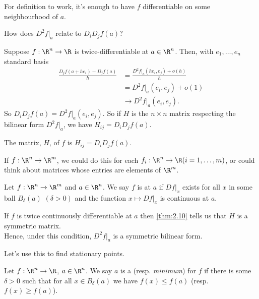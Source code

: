 \begin{remark}
For definition to work, it's enough to have $f$ differentiable on some neighbourhood of $a$.
\end{remark}

\begin{question}
    How does $D^2f|_a$ relate to $D_i D_j f(a)$?
\end{question} 

Suppose $f:\R^n\to\R$ is twice-differentiable at $a\in \R^n$. 
Then, with $e_1,\dots ,e_n$ standard basis 
\begin{align*}
    \frac{D_jf(a+he_i)-D_jf(a)}{h} &= \frac{D^2f|_a(he_i,e_j) + o(h)}{h}\\
    &= D^2f|_a(e_i,e_j) + o(1) \\
    &\to D^2f|_a(e_i,e_j).
\end{align*}
So $D_iD_jf(a) = D^2f|_a(e_i,e_j)$. 
So if $H$ is the $n\times n$ matrix respecting the bilinear form $D^2f|_a$, we have $H_{ij} = D_iD_jf(a)$. 

\begin{definition}[Hessian]
    The  matrix, $H$, of $f$ is $H_{ij} = D_iD_jf(a)$.
\end{definition} 

If $f:\R^n\to\R^m$, we could do this for each $f_i: \R^n\to \R (i=1,\dots ,m)$, or could think about matrices whose entries are elements of $\R^m$.

\begin{definition}
    Let $f:\R^n \to \R^m$ and $a \in \R^n$. 
    We say $f$ is  at $a$ if $Df|_x$ exists for all $x$ in some ball $B_\delta(a)$ $(\delta > 0)$ and the function $x\mapsto Df|_x$ is continuous at $a$.
\end{definition}

\begin{remark}
    If $f$ is twice continuously differentiable at $a$ then \cref{thm:2.10} tells us that $H$ is a symmetric matrix. \\
    Hence, under this condition, $D^2f|_a$ is a symmetric bilinear form. 
\end{remark}

Let's use this to find stationary points.
\begin{definition}
    Let $f:\R^n \to \R$, $a \in \R^n$. 
    We say $a$ is a  (resp. \emph{minimum}) for $f$ if there is some $\delta>0$ such that for all $x\in B_\delta(a)$ we have $f(x)\leq f(a)$ (resp. $f(x) \ge f(a)$).
\end{definition}

